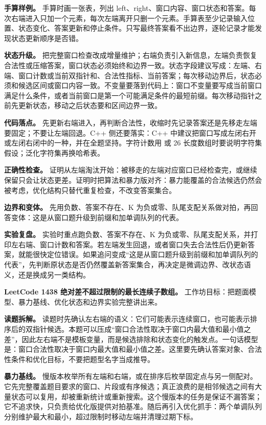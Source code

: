 \textbf{手算样例。} 手算时画一张表，列出 left、right、窗口内容、窗口状态和答案。每次右端进入只加一个元素，每次左端离开只删一个元素。手算表至少记录输入位置、状态变化、答案更新和停止条件。只写最终答案看不出边界，逐轮记录才能发现状态更新顺序是否错。

\textbf{状态升级。} 把完整窗口检查改成增量维护；右端负责引入新信息，左端负责恢复合法性或压缩答案，窗口状态必须始终和边界一致。状态字段建议写成：左端、右端、窗口计数或当前双指针和、合法性指标、当前答案；每次移动边界后，状态必须和候选区间或窗口内容一致。不变量要落到代码上：窗口不变量要写成当前窗口满足什么条件，或者当前窗口是第一个可能满足条件的最短前缀。每次移动指针之前先更新状态，移动之后状态要和区间边界一致。

\textbf{代码落点。} 先更新右端进入，再判断合法性，收缩时先记录答案还是先移走左端要固定；不要让左端回退。C++ 侧还要落实：C++ 中建议把窗口写成左闭右开或左闭右闭中的一种，并在全题坚持。字符计数用  或 26 长度数组时要说明字符集假设；泛化字符集再换哈希表。

\textbf{正确性检查。} 证明从左端淘汰开始：被移走的左端对应窗口已经检查完，或继续保留只会让状态更差。证明时把算法和暴力版对齐：暴力能覆盖的合法候选仍然会被考虑，优化结构只替代重复检查，不改变答案集合。

\textbf{边界和变体。} 先用负数、答案不存在、K 为负或零、队尾支配关系做对拍，再回答变体：这是从窗口题升级到前缀和加单调队列的代表。

\textbf{实验复盘。} 实验时重点跑负数、答案不存在、K 为负或零、队尾支配关系，并打印左右端、窗口计数和答案。若左端发生回退，或者窗口失去合法性后仍更新答案，就能很快定位错误。如果追问变成“这是从窗口题升级到前缀和加单调队列的代表”，先判断原状态是否仍然覆盖新答案集合，再决定是微调边界、改状态语义，还是换成另一类结构。

\noindent\textbf{LeetCode 1438 绝对差不超过限制的最长连续子数组。} 工作坊目标：把题面模型、暴力基线、优化状态和边界实验完整讲出来。

\textbf{读题拆解。} 读题时先确认左右端的语义：它们可能表示连续窗口，也可能表示排序后的双指针候选。本题可以压成“窗口合法性取决于窗口内最大值和最小值之差”，因此左右端不是模板变量，而是候选排除和状态变化的触发点。一句话模型是：窗口合法性取决于窗口内最大值和最小值之差。这里要先确认答案对象、合法性条件和优化目标，不要把题型名字当成推导。

\textbf{暴力基线。} 慢版本枚举所有左端和右端，或在排序后枚举固定点与另一侧配对。它先完整覆盖题目要求的窗口、片段或有序候选；真正浪费的是相邻候选之间有大量状态可以复用，却被重新统计或重新搜索。这个慢版本的任务是保证不漏答案；它不追求快，只负责给优化版提供对拍基准。随后再引入优化抓手：两个单调队列分别维护最大和最小，超过限制时移动左端并清理过期下标。

